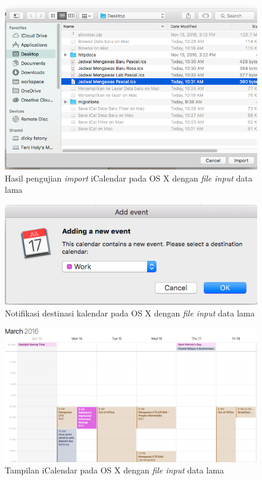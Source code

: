 			\begin{figure}[H]
			\centering
			\includegraphics[scale=0.5]{Gambar/Import-Jadwal-on-Mac}
			\caption{Hasil pengujian \textit{import} iCalendar pada OS X dengan \textit{file input} data lama}
			\label{fig:Import-Jadwal-on-Mac}
			\end{figure}
			
			\begin{figure}[H]
			\centering
			\includegraphics[scale=0.5]{Gambar/Import-Jadwal-2-on-Mac}
			\caption{Notifikasi destinasi kalendar pada OS X dengan \textit{file input} data lama}
			\label{fig:Import-Jadwal-2-on-Mac}
			\end{figure}
			
			\begin{figure}[H]
			\centering
			\includegraphics[scale=0.4]{Gambar/Hasil-import-on-Mac}
			\caption{Tampilan iCalendar pada OS X dengan \textit{file input} data lama}
			\label{fig:Hasil-import-on-Mac}
			\end{figure}
			
